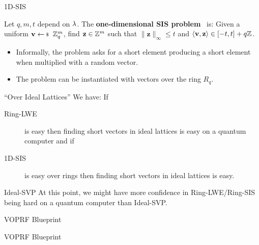 \documentclass[xcolor=table,10pt,aspectratio=169]{beamer}
\begin{document}
\begin{frame}[label={sec:orgd232589}]{1D-SIS}
\begin{definition} Let $ q,m,t $ depend on $ \lambda $. The
  \textbf{one-dimensional SIS problem}~ is: Given a uniform \( \mathbf{v} \sample \ZZ_q^m\), find \(\mathbf{z} \in \mathbb{Z}^m\) such that \( \|\mathbf{z}\|_\infty \leq t \) and \( \langle \mathbf{v}, \mathbf{z} \rangle \in [-t,t] + q \mathbb{Z}\).
\end{definition}

\begin{itemize}
\item Informally, the problem asks for a short element producing a short element when multiplied with a random vector.
\item The problem can be instantiated with vectors over the ring \(R_q\).
\end{itemize}
\end{frame}

\begin{frame}[label={sec:orge09296e}]{“Over Ideal Lattices”}
We have: If
\begin{description}
\item[{Ring-LWE}] is easy then finding short vectors in ideal lattices is easy on a quantum computer and if
\item[{1D-SIS}] is easy over rings then finding short vectors in ideal lattices is easy.
\end{description}

\pause

\begin{block}{Ideal-SVP}
At this point, we might have more confidence in Ring-LWE/Ring-SIS being hard on a quantum computer than Ideal-SVP.
\end{block}
\end{frame}

\begin{frame}[label={sec:orgb5b133b}]{VOPRF Blueprint}
\centering
{}
\end{frame}

\begin{frame}[label={sec:org923d8f8}]{VOPRF Blueprint}
\centering
{}
\end{frame}
\end{document}
